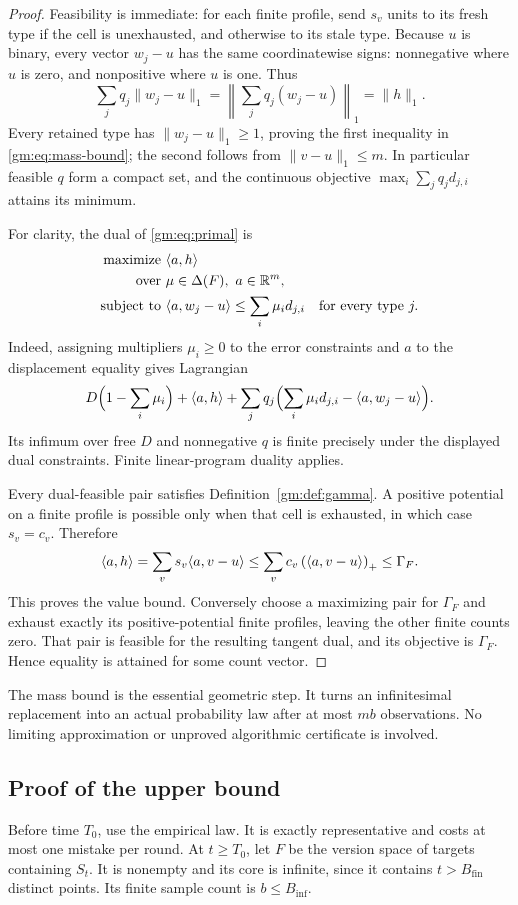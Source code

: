 \begin{proof}
Feasibility is immediate: for each finite profile, send $s_v$ units to its fresh type if the cell is unexhausted, and otherwise to its stale type. Because $u$ is binary, every vector $w_j-u$ has the same coordinatewise signs: nonnegative where $u$ is zero, and nonpositive where $u$ is one. Thus
\[
\sum_jq_j\|w_j-u\|_1
=\left\|\sum_jq_j(w_j-u)\right\|_1=\|h\|_1.
\]
Every retained type has $\|w_j-u\|_1\ge1$, proving the first inequality in \eqref{gm:eq:mass-bound}; the second follows from $\|v-u\|_1\le m$. In particular feasible $q$ form a compact set, and the continuous objective $\max_i\sum_jq_jd_{j,i}$ attains its minimum.

For clarity, the dual of \eqref{gm:eq:primal} is
\begin{equation}\label{gm:eq:tangent-dual}
\begin{aligned}
\text{maximize }&\langle a,h\rangle\\
\text{over }&\mu\in\Delta(F),\ a\in\mathbb R^m,\\
\text{subject to }&\langle a,w_j-u\rangle\le\sum_i\mu_id_{j,i}\quad\text{for every type }j.
\end{aligned}
\end{equation}
Indeed, assigning multipliers $\mu_i\ge0$ to the error constraints and $a$ to the displacement equality gives Lagrangian
\[
D\Bigl(1-\sum_i\mu_i\Bigr)+\langle a,h\rangle
+\sum_jq_j\Bigl(\sum_i\mu_id_{j,i}-\langle a,w_j-u\rangle\Bigr).
\]
Its infimum over free $D$ and nonnegative $q$ is finite precisely under the displayed dual constraints. Finite linear-program duality applies.

Every dual-feasible pair satisfies Definition~\ref{gm:def:gamma}. A positive potential on a finite profile is possible only when that cell is exhausted, in which case $s_v=c_v$. Therefore
\[
\langle a,h\rangle=\sum_vs_v\langle a,v-u\rangle
\le\sum_vc_v\left(\langle a,v-u\rangle\right)_+\le\Gamma_F.
\]
This proves the value bound. Conversely choose a maximizing pair for $\Gamma_F$ and exhaust exactly its positive-potential finite profiles, leaving the other finite counts zero. That pair is feasible for the resulting tangent dual, and its objective is $\Gamma_F$. Hence equality is attained for some count vector.
\end{proof}
The mass bound is the essential geometric step. It turns an infinitesimal replacement into an actual probability law after at most $mb$ observations. No limiting approximation or unproved algorithmic certificate is involved.

\subsection{Proof of the upper bound}
Before time $T_0$, use the empirical law. It is exactly representative and costs at most one mistake per round. At $t\ge T_0$, let $F$ be the version space of targets containing $S_t$. It is nonempty and its core is infinite, since it contains $t>B_{\mathrm{fin}}$ distinct points. Its finite sample count is $b\le B_{\mathrm{inf}}$.

